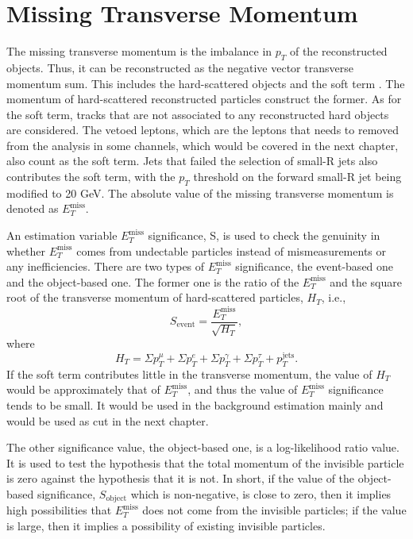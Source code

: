 \documentclass[class=NCU_thesis, crop=false]{standalone}
\begin{document}
\section{Missing Transverse Momentum}\label{MET}
	The missing transverse momentum is the imbalance in $p_T$ of the reconstructed objects. Thus, it can be reconstructed as the negative vector transverse momentum sum. This includes the hard-scattered objects and the soft term \cite{1609.09324}. The momentum of hard-scattered reconstructed particles construct the former. As for the soft term, tracks that are not associated to any reconstructed hard objects are considered. The vetoed leptons, which are the leptons that needs to removed from the analysis in some channels, which would be covered in the next chapter, also count as the soft term. Jets that failed the selection of small-R jets also contributes the soft term, with the $p_T$ threshold on the forward small-R jet being modified to 20 GeV. The absolute value of the missing transverse momentum is denoted as $E_T^{\mathrm{miss}}$.
	
	An estimation variable $E_T^{\mathrm{miss}}$ significance, S, is used to check the genuinity in whether $E_T^{\mathrm{miss}}$ comes from undectable particles instead of mismeasurements or any inefficiencies. There are two types of $E_T^{\mathrm{miss}}$ significance, the event-based one and the object-based one. The former one is the ratio of the $E_T^{\mathrm{miss}}$ and the square root of the transverse momentum of hard-scattered particles, $H_T$, i.e.,
	\begin{equation}
		S_{\mathrm{event}} = \frac{E_T^{\mathrm{miss}}}{\sqrt{H_T}},
	\end{equation}
	where
	\begin{equation}
		H_T = \Sigma p_T^{\mu} + \Sigma p_T^e + \Sigma p_T^{\gamma} + \Sigma p_T^{\tau} + p_T^{\mathrm{jets}}.
	\end{equation}
	If the soft term contributes little in the transverse momentum, the value of $H_T$ would be approximately that of $E_T^{\mathrm{miss}}$, and thus the value of $E_T^{\mathrm{miss}}$ significance tends to be small. It would be used in the background estimation mainly and would be used as cut in the next chapter.
	
	The other significance value, the object-based one, is a log-likelihood ratio value. It is used to test the hypothesis that the total momentum of the invisible particle is zero against the hypothesis that it is not. In short, if the value of the object-based significance, $S_{\mathrm{object}}$ which is non-negative, is close to zero, then it implies high possibilities that $E_T^{\mathrm{miss}}$ does not come from the invisible particles; if the value is large, then it implies a possibility of existing invisible particles.
	
\end{document}
